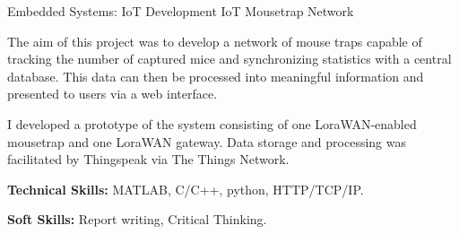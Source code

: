 

\begin{cventries}

  \cventry
    {Embedded Systems: IoT Development} %
    {IoT Mousetrap Network} %
    {} %
    {} %
    {
      \begin{cvitems} %
        \item {The aim of this project was to develop a network of mouse traps capable of tracking the number of captured mice and synchronizing statistics with a central database. This data can then be processed into meaningful information and presented to users via a web interface.}
        \item {I developed a prototype of the system consisting of one LoraWAN-enabled mousetrap and one LoraWAN gateway. Data storage and processing was facilitated by Thingspeak via The Things Network.}
        \item {\textbf{Technical Skills:} MATLAB, C/C++, python, HTTP/TCP/IP.}
        \item {\textbf{Soft Skills:} Report writing, Critical Thinking.}
      \end{cvitems}
    }

\begin{comment}
  \cventry
    {Embedded Systems: RTOS} %
    {Advanced Traffic Light System using QNX Neutrino} %
    {} %
    {} %
    {
      \begin{cvitems} %
        \item {We developed a traffic light system with two intersections and a rail level crossing. Each
        intersection had a controller that managed sequences. The railroad was sensor driven.}
        \item {A central controller managed all other controllers. The central controller could override the
        level crossing allowing for manual opening and closing of the boom gates. The central
        controller could also modify the traffic light sequences of each intersection.}
        \item {I was working
        with two other team members.}
        \item {\textbf{Technical Skills:} QNX Neutrino, Git, Discord (For Collaboration).}
        \item {\textbf{Soft Skills:} Critical Thinking, Time Management, Teamwork.}
      \end{cvitems}
    }
\end{comment}



\end{cventries}
